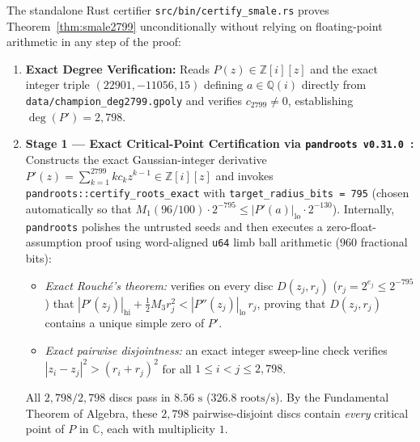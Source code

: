 \documentclass[11pt,a4paper]{amsart}
\theoremstyle{remark}
\newcommand{\C}{\mathbb{C}}
\newcommand{\Q}{\mathbb{Q}}
\newcommand{\Z}{\mathbb{Z}}
\begin{document}
The standalone Rust certifier \texttt{src/bin/certify\_smale.rs} proves
Theorem~\ref{thm:smale2799} unconditionally without relying on floating-point
arithmetic in any step of the proof:

\begin{enumerate}
  \item \textbf{Exact Degree Verification:}
  Reads $P(z) \in \Z[i][z]$ and the exact integer triple
  $(22901, -11056, 15)$ defining $a \in \Q(i)$ directly from
  \texttt{data/champion\_deg2799.gpoly} and verifies $c_{2799} \neq 0$,
  establishing $\deg(P') = 2{,}798$.

  \item \textbf{Stage 1 --- Exact Critical-Point Certification via
  \texttt{pandroots v0.31.0}~\cite{pandroots}:}
  Constructs the exact Gaussian-integer derivative
  $P'(z) = \sum_{k=1}^{2799} k c_k z^{k-1} \in \Z[i][z]$ and invokes
  \texttt{pandroots::certify\_roots\_exact} with
  \texttt{target\_radius\_bits = 795} (chosen automatically so that
  $M_1(96/100) \cdot 2^{-795} \le |P'(a)|_{\mathrm{lo}} \cdot 2^{-130}$).
  Internally, \texttt{pandroots} polishes the untrusted seeds and then executes
  a zero-float-assumption proof using word-aligned \texttt{u64} limb ball
  arithmetic ($960$ fractional bits):
  \begin{itemize}
    \item \emph{Exact Rouch\'e's theorem:} verifies on every disc
    $D(z_j, r_j)$ ($r_j = 2^{e_j} \le 2^{-795}$) that
    $|P'(z_j)|_{\mathrm{hi}} + \frac{1}{2} M_3 r_j^2 < |P''(z_j)|_{\mathrm{lo}}\, r_j$,
    proving that $D(z_j, r_j)$ contains a unique simple zero of $P'$.
    \item \emph{Exact pairwise disjointness:} an exact integer sweep-line check
    verifies $|z_i - z_j|^2 > (r_i + r_j)^2$ for all $1 \le i < j \le 2{,}798$.
  \end{itemize}
  All $2{,}798 / 2{,}798$ discs pass in $8.56\text{ s}$ ($326.8\text{ roots/s}$).
  By the Fundamental Theorem of Algebra, these $2{,}798$ pairwise-disjoint discs
  contain \emph{every} critical point of $P$ in $\C$, each with multiplicity $1$.


\end{enumerate}
\end{document}
